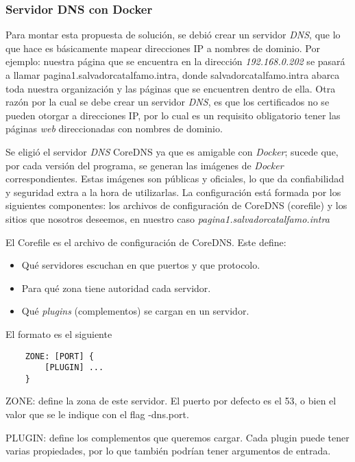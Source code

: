 \subsubsection*{Servidor DNS con Docker}

Para montar esta propuesta de solución, se debió crear un servidor \emph{DNS}, que lo que hace
es básicamente mapear direcciones IP a nombres de dominio. Por ejemplo: nuestra página que 
se encuentra en la dirección \textit{192.168.0.202} se pasará a llamar pagina1.salvadorcatalfamo.intra, 
donde salvadorcatalfamo.intra abarca toda nuestra organización y las páginas que se encuentren
dentro de ella. Otra razón por la cual se debe 
crear un servidor \emph{DNS}, es que los certificados no se pueden otorgar a direcciones IP, por lo 
cual es un requisito obligatorio tener las páginas \emph{web} direccionadas con nombres de dominio.

Se eligió el servidor \emph{DNS} CoreDNS ya que es amigable con \emph{Docker}; sucede que, por cada versión del 
programa, se generan las imágenes de \emph{Docker} correspondientes. Estas imágenes son públicas y oficiales, 
lo que da confiabilidad y seguridad extra a la hora de utilizarlas. La configuración está formada por 
los siguientes componentes: los archivos de configuración de CoreDNS (corefile) y los sitios que 
nosotros deseemos, en nuestro caso \textit{pagina1.salvadorcatalfamo.intra}

\noindent El Corefile es el archivo de configuración de CoreDNS. Este define:
\begin{itemize}
    \setlength\itemsep{-0.6em}
    \item Qué servidores escuchan en que puertos y que protocolo.
    \item Para qué zona tiene autoridad cada servidor.
    \item Qué \emph{plugins} (complementos) se cargan en un servidor.
\end{itemize}

\noindent El formato es el siguiente
\begin{verbatim}
    ZONE: [PORT] {
        [PLUGIN] ...
    }
\end{verbatim}

\noindent ZONE: define la zona de este servidor. El puerto por defecto es el \textsf{53}, o bien el valor que se le indique 
con el flag \textsf{-dns.port}.

\noindent PLUGIN: define los complementos que queremos cargar. Cada plugin puede tener varias propiedades, por 
lo que también podrían tener argumentos de entrada.

